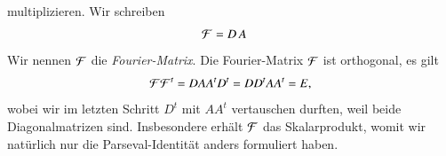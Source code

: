 multiplizieren.
Wir schreiben
\begin{align*}
{\cal F}
&=
D\, A
\end{align*}
Wir nennen $\cal F$ die {\em Fourier-Matrix}.
%
Die Fourier-Matrix $\cal F$ ist orthogonal, es gilt
\[
{\cal F}{\cal F}^t
=
DAA^tD^t
=
DD^tAA^t
=
E,
\]
wobei wir im letzten Schritt $D^t$ mit $AA^t$ vertauschen durften,
weil beide Diagonalmatrizen sind.
Insbesondere erhält $\cal F$ das Skalarprodukt, womit wir natürlich
nur die Parseval-Identität anders formuliert haben.




